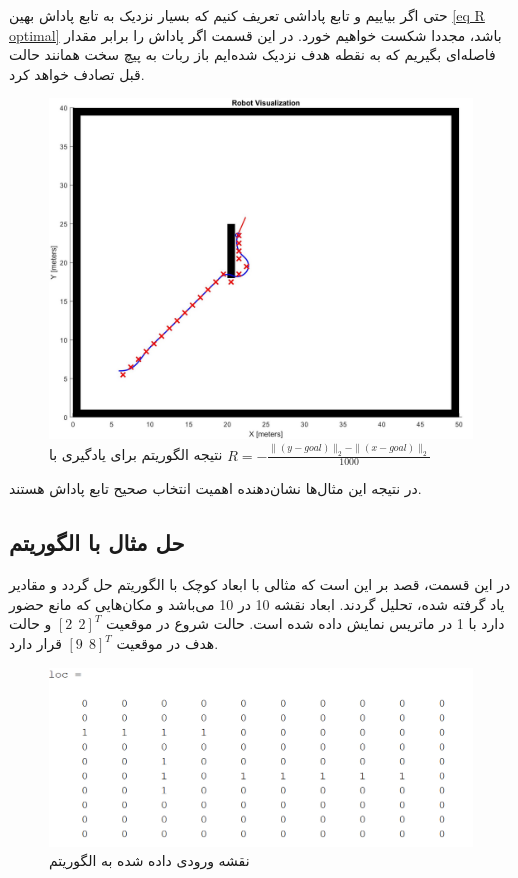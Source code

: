 حتی اگر بیاییم و تابع پاداشی تعریف کنیم که بسیار نزدیک به تابع پاداش بهین \ref{eq R optimal} باشد، مجددا شکست خواهیم خورد. در این قسمت اگر پاداش را برابر مقدار فاصله‌ای بگیریم که به نقطه هدف نزدیک شده‌ایم باز ربات به پیچ سخت همانند حالت قبل تصادف خواهد کرد.
\begin{figure}[!h]
	\centering
	\includegraphics[scale=0.3]{Images/QL path R=-normpos-xy.jpg}
	\caption{نتیجه الگوریتم  برای یادگیری با $R=-\frac{\|(y-goal)\|_2 - \|(x-goal)\|_2}{1000}$}
\end{figure}

در نتیجه این مثال‌ها نشان‌دهنده اهمیت انتخاب صحیح تابع پاداش هستند.


\subsection{حل مثال با الگوریتم }
در این قسمت، قصد بر این است که مثالی با ابعاد کوچک با الگوریتم  حل گردد و مقادیر یاد گرفته شده، تحلیل گردند. ابعاد نقشه 10 در 10 می‌باشد و مکان‌هایی که مانع حضور دارد با 1 در ماتریس  نمایش داده شده است. حالت شروع در موقعیت $[2~~2]^T$ و حالت هدف در موقعیت $[9~~8]^T$ قرار دارد.
\begin{figure}[!h]
	\centering
	\includegraphics[scale=0.4]{Images/example-loc.png}
	\caption{نقشه ورودی داده شده به الگوریتم }
\end{figure}

